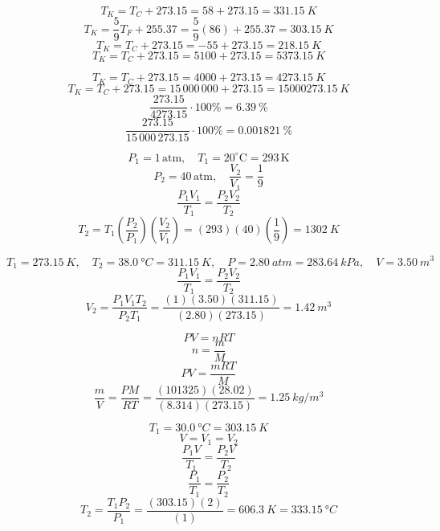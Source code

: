 \documentclass[11pt]{homework}
\begin{document}
\setcounter{questionCounter}{29}
\question
\begin{alphaparts}
\questionpart
\[
T_K = T_C + 273.15 = 58 + 273.15 = \boxed{\qty{331.15}{K}}
\]
\questionpart
\[
T_K = \frac{5}{9}T_F + 255.37 = \frac{5}{9}(86)+255.37 = \boxed{\qty{303.15}{K}}
\]
\questionpart
\[
T_K = T_C + 273.15 = -55 + 273.15 = \boxed{\qty{218.15}{K}}
\]
\questionpart
\[
T_K = T_C + 273.15 = 5100 + 273.15 = \boxed{\qty{5373.15}{K}}
\]
\end{alphaparts}

\setcounter{questionCounter}{32}
\question
\begin{alphaparts}
\questionpart
\[
T_K = T_C + 273.15 = 4000 + 273.15 = \boxed{\qty{4273.15}{K}}
\]
\[
    T_K = T_C + 273.15 = 15\,000\,000 + 273.15 = \boxed{\qty{15000273.15}{K}}
\]
\questionpart
\[
\frac{273.15}{4273.15} \cdot 100\% = \boxed{\qty{6.39}{\%}}
\]
\[
    \frac{273.15}{15\,000\,273.15} \cdot 100\% = \boxed{\qty{0.001821}{\%}}
\]


\end{alphaparts}

\question
\[
P_1 = 1 \, \text{atm}, \quad T_1 = 20^\circ \text{C} = 293 \, \text{K}
\]
\[
P_2 = 40 \, \text{atm}, \quad \frac{V_2}{V_1} = \frac{1}{9}
\]
\[
\frac{P_1V_1}{T_1}=\frac{P_2V_2}{T_2}
\]
\[
T_2 = T_1(\frac{P_2}{P_1})(\frac{V_2}{V_1}) = (293)(40)(\frac{1}{9}) = \boxed{\qty{1302}{K}}
\]


\question
\[
T_1 = \qty{273.15}{K}, \quad T_2 = \qty{38.0}{\degree C} = \qty{311.15}{K}, \quad P = \qty{2.80}{atm} = \qty{283.64}{kPa}, \quad V = \qty{3.50}{m^3}
\]
\[
    \frac{P_1V_1}{T_1} = \frac{P_2V_2}{T_2}
\]
\[
V_2 = \frac{P_1V_1T_2}{P_2T_1} = \frac{(1)(3.50)(311.15)}{(2.80)(273.15)} =  \boxed{\qty{1.42}{m^3}}
\]


\setcounter{questionCounter}{36}
\question
\[
PV=nRT
\]
\[
n = \frac{m}{M}
\]
\[
PV = \frac{mRT}{M}
\]
\[
\frac{m}{V}=\frac{PM}{RT}=\frac{(101325)(28.02)}{(8.314)(273.15)} = \boxed{\qty{1.25}{kg / m^3}}
\]


\setcounter{questionCounter}{42}
\question
\[
T_1 = \qty{30.0}{\degree C} = \qty{303.15}{K}
\]
\[
V = V_1 = V_2
\]
\[
\frac{P_1V}{T_1} = \frac{P_2V}{T_2}
\]
\[
\frac{P_1}{T_1} = \frac{P_2}{T_2}
\]
\[
    T_2 = \frac{T_1P_2}{P_1} = \frac{(303.15)(2)}{(1)} = \qty{606.3}{K} = \boxed{\qty{333.15}{\degree C}}
\]
\end{document}

